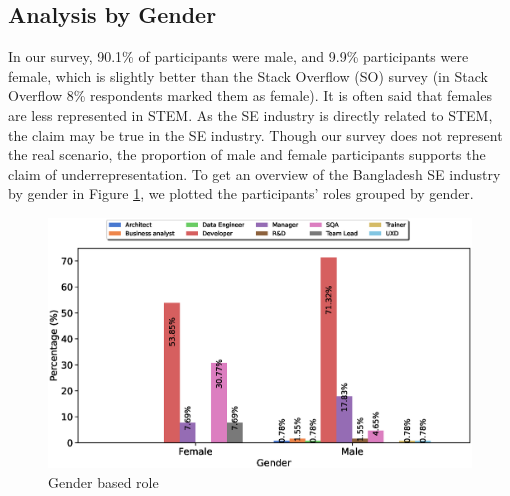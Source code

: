 \subsection{Analysis by Gender}
\label{analysis by gender}

In our survey, 90.1\% of participants were male, and 9.9\% participants were female, which is slightly better than the Stack Overflow (SO) survey\citep{StackoverflowSurvey2017,StackoverflowSurvey2018,StackoverflowSurvey2019,StackoverflowSurvey2020} (in Stack Overflow 8\% respondents marked them as female). It is often said that females are less represented in STEM. As the SE industry is directly related to STEM, the claim may be true in the SE industry. Though our survey does not represent the real scenario, the proportion of male and female participants supports the claim of underrepresentation. To get an overview of the Bangladesh SE industry by gender in Figure \ref{fig:gender and role}, we plotted the participants' roles grouped by gender. 
\begin{figure}[h]
\centering
 \includegraphics[scale=0.4]{Figures/Gender_and_Role}
 \caption{Gender based role}
 \label{fig:gender and role}
\end{figure}
